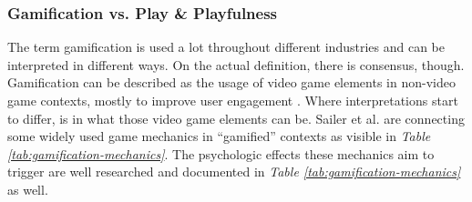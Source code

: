 \subsubsection{Gamification vs. Play \& Playfulness}

The term gamification is used a lot throughout different industries and can be interpreted in different ways. On the actual definition, there is consensus, though. Gamification can be described as the usage of video game elements in non-video game contexts, mostly to improve user engagement \cite{deterding2011gamification}. Where interpretations start to differ, is in what those video game elements can be. Sailer et al. are connecting some widely used game mechanics in \enquote{gamified} contexts as visible in \textit{Table \ref{tab:gamification-mechanics}}. The psychologic effects these mechanics aim to trigger are well researched and documented in \textit{Table \ref{tab:gamification-mechanics}} as well.

